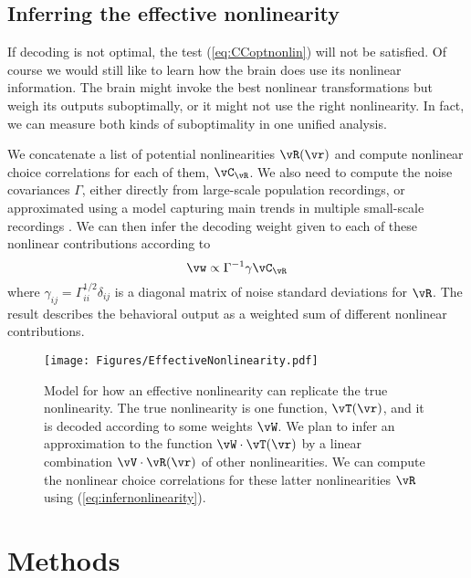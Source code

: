 \documentclass[11pt,twocolumn]{article}
\begin{document}
\subsection{Inferring the effective nonlinearity}

If decoding is not optimal, the test (\ref{eq:CCoptnonlin}) will not be satisfied. Of course we would still like to learn how the brain does use its nonlinear information. The brain might invoke the best nonlinear transformations but weigh its outputs suboptimally, or it might not use the right nonlinearity. In fact, we can measure both kinds of suboptimality in one unified analysis.

We concatenate a list of potential nonlinearities $\vR(\vr)$ and compute nonlinear choice correlations for each of them, $\vC_\vR$. We also need to compute the noise covariances $\Gamma$, either directly from large-scale population recordings, or approximated using a model capturing main trends in multiple small-scale recordings \cite{ganmor2011sparse,ohiorhenuan2010sparse,cohen2011measuring,chen2013functional,kanitscheider2015measuring,ecker2011effect,liu2013choice,yatsenko2015improved}. We can then infer the decoding weight given to each of these nonlinear contributions according to
\begin{equation}
	\vw\propto\Gamma^{-1}\gamma\vC_\vR
	\label{eq:infernonlinearity}
\end{equation}
where $\gamma_{ij}=\Gamma_{ii}^{1/2}\delta_{ij}$ is a diagonal matrix of noise standard deviations for $\vR$. The result describes the behavioral output as a weighted sum of different nonlinear contributions.



\begin{figure}[1][hbt]
  \centering
  \texttt{[image: Figures/EffectiveNonlinearity.pdf]}
  \caption{Model for how an effective nonlinearity can replicate the true nonlinearity. The true nonlinearity is one function, $\vT(\vr)$, and it is decoded according to some weights $\vW$. We plan to infer an approximation to the function $\vW\cdot\vT(\vr)$ by a linear combination $\vV\cdot\vR(\vr)$ of other nonlinearities. We can compute the nonlinear choice correlations for these latter nonlinearities $\vR$ using (\ref{eq:infernonlinearity}).}
  \label{fig:effectivenonlinearity}
\end{figure}





\section{Methods}
\end{document}
